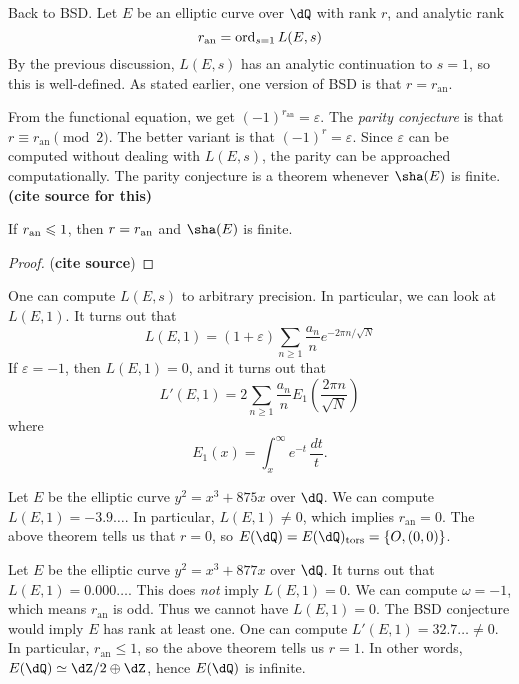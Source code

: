 \documentclass{article}
\begin{document}
Back to BSD. Let $E$ be an elliptic curve over $\dQ$ with rank $r$, and 
analytic rank 
\[
  r_\text{an} = \operatorname{ord}_{s=1} L(E,s)
\]
By the previous discussion, $L(E,s)$ has an analytic continuation to $s=1$, so 
this is well-defined. As stated earlier, one version of BSD is that 
$r=r_\text{an}$. 

From the functional equation, we get $(-1)^{r_\text{an}}=\varepsilon$. The 
\emph{parity conjecture} is that $r\equiv r_\text{an}\pmod 2$. The better 
variant is that $(-1)^r=\varepsilon$. Since $\varepsilon$ can be computed without 
dealing with $L(E,s)$, the parity can be approached computationally. The parity 
conjecture is a theorem whenever $\sha(E)$ is finite. \textbf{(cite source for 
this)}

\begin{theorem}
If $r_\textnormal{an}\leqslant 1$, then $r=r_\textnormal{an}$ and $\sha(E)$ is 
finite. 
\end{theorem}
\begin{proof}
(\textbf{cite source})
\end{proof}

One can compute $L(E,s)$ to arbitrary precision. In particular, we can look at 
$L(E,1)$. It turns out that 
\[
  L(E,1) = (1+\varepsilon) \sum_{n\geqslant 1} \frac{a_n}{n} e^{-2\pi n/\sqrt N}
\]
If $\varepsilon=-1$, then $L(E,1)=0$, and it turns out that 
\[
  L'(E,1) = 2 \sum_{n\geqslant 1} \frac{a_n}{n} E_1(\frac{2\pi n}{\sqrt N})
\]
where 
\[
  E_1(x) = \int_x^\infty e^{-t}\, \frac{dt}{t} \text{.}
\]

\begin{example}
Let $E$ be the elliptic curve $y^2=x^3+875 x$ over $\dQ$. We can compute 
$L(E,1) = -3.9\ldots$. In particular, $L(E,1)\ne 0$, which implies 
$r_\text{an}=0$. The above theorem tells us that $r=0$, so 
$E(\dQ)=E(\dQ)_\text{tors}=\{O,(0,0)\}$. 
\end{example}

\begin{example}
Let $E$ be the elliptic curve $y^2=x^3+877 x$ over $\dQ$. It turns out that 
$L(E,1) = 0.000\ldots$. This does \emph{not} imply $L(E,1) = 0$. We can 
compute $\omega=-1$, which means $r_\text{an}$ is odd. Thus we cannot have 
$L(E,1) = 0$. The BSD conjecture would imply $E$ has rank at least one. One 
can compute $L'(E,1) = 32.7\dots\ne 0$. In particular, 
$r_\text{an}\leqslant 1$, so the above theorem tells us $r=1$. In other words, 
$E(\dQ)\simeq \dZ/2\oplus \dZ$, hence $E(\dQ)$ is infinite. 
\end{example}
\end{document}
